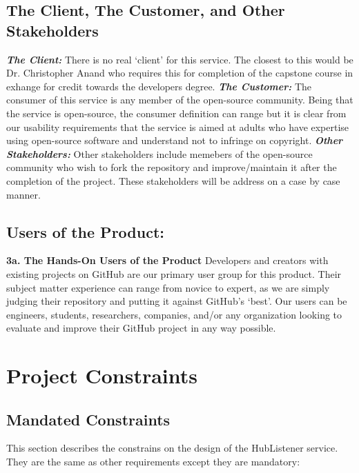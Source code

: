 \documentclass{article}
\begin{document}
\subsection{The Client, The Customer, and Other Stakeholders}
\textbf{\textit{The Client:}}
There is no real `client' for this service. The closest to this would be Dr. Christopher Anand who requires this for completion of the capstone course in exhange for credit towards the developers degree.  \newline
\textbf{\textit{The Customer:}}
The consumer of this service is any member of the open-source community. Being that the service is open-source, the consumer definition can range but it is clear from our usability requirements that the service is aimed at adults who have expertise using open-source software and understand not to infringe on copyright. \newline
\textbf{\textit{Other Stakeholders:}}
Other stakeholders include memebers of the open-source community who wish to fork the repository and improve/maintain it after the completion of the project. These stakeholders will be address on a case by case manner. \newline

\subsection{Users of the Product:}
\textbf{3a. The Hands-On Users of the Product}
Developers and creators with existing projects on GitHub are our primary user group for this product. Their subject matter experience can range from novice to expert, as we are simply judging their repository and putting it against GitHub’s ‘best’. Our users can be engineers, students, researchers, companies, and/or any organization looking to evaluate and improve their GitHub project in any way possible. 
\newpage


\section{Project Constraints}
\subsection{Mandated Constraints}

This section describes the constrains on the design of the HubListener service. They are the same as other requirements except they are mandatory:\newline
\newline
\end{document}
